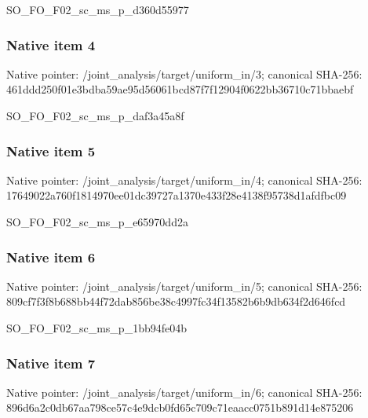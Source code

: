\documentclass[10pt,a4paper]{article}
\begin{document}
\begingroup\raggedright\sloppy SO\_\allowbreak{}FO\_\allowbreak{}F02\_\allowbreak{}sc\_\allowbreak{}ms\_\allowbreak{}p\_\allowbreak{}d360d55977\par\endgroup

\subsubsection{Native item 4}
Native pointer: /joint\_\allowbreak{}analysis/target/uniform\_\allowbreak{}in/3; canonical SHA-256: 461ddd250f01e3bdba59ae95d56061bcd87f7f12904f0622bb36710c71bbaebf

\begingroup\raggedright\sloppy SO\_\allowbreak{}FO\_\allowbreak{}F02\_\allowbreak{}sc\_\allowbreak{}ms\_\allowbreak{}p\_\allowbreak{}daf3a45a8f\par\endgroup

\subsubsection{Native item 5}
Native pointer: /joint\_\allowbreak{}analysis/target/uniform\_\allowbreak{}in/4; canonical SHA-256: 17649022a760f1814970ee01dc39727a1370e433f28e4138f95738d1afdfbc09

\begingroup\raggedright\sloppy SO\_\allowbreak{}FO\_\allowbreak{}F02\_\allowbreak{}sc\_\allowbreak{}ms\_\allowbreak{}p\_\allowbreak{}e65970dd2a\par\endgroup

\subsubsection{Native item 6}
Native pointer: /joint\_\allowbreak{}analysis/target/uniform\_\allowbreak{}in/5; canonical SHA-256: 809cf7f3f8b688bb44f72dab856be38c4997fc34f13582b6b9db634f2d646fcd

\begingroup\raggedright\sloppy SO\_\allowbreak{}FO\_\allowbreak{}F02\_\allowbreak{}sc\_\allowbreak{}ms\_\allowbreak{}p\_\allowbreak{}1bb94fe04b\par\endgroup

\subsubsection{Native item 7}
Native pointer: /joint\_\allowbreak{}analysis/target/uniform\_\allowbreak{}in/6; canonical SHA-256: 896d6a2c0db67aa798ce57c4e9dcb0fd65c709c71eaacc0751b891d14e875206
\end{document}
